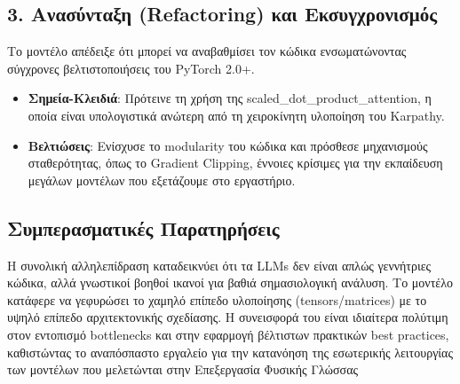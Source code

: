 \subsection*{3. Ανασύνταξη (Refactoring) και Εκσυγχρονισμός}
Το μοντέλο απέδειξε ότι μπορεί να αναβαθμίσει τον κώδικα ενσωματώνοντας σύγχρονες βελτιστοποιήσεις του PyTorch 2.0+.
\begin{itemize}
    \item \textbf{Σημεία-Κλειδιά}: Πρότεινε τη χρήση της scaled\_dot\_product\_attention, η οποία είναι υπολογιστικά ανώτερη από τη χειροκίνητη υλοποίηση του Karpathy.
    \item \textbf{Βελτιώσεις}: Ενίσχυσε το modularity του κώδικα και πρόσθεσε μηχανισμούς σταθερότητας, όπως το Gradient Clipping, έννοιες κρίσιμες για την εκπαίδευση μεγάλων μοντέλων που εξετάζουμε στο εργαστήριο.
\end{itemize}

    
\subsection*{Συμπερασματικές Παρατηρήσεις}
Η συνολική αλληλεπίδραση καταδεικνύει ότι τα LLMs δεν είναι απλώς γεννήτριες κώδικα, αλλά γνωστικοί βοηθοί ικανοί για βαθιά σημασιολογική ανάλυση. Το μοντέλο κατάφερε να γεφυρώσει το χαμηλό επίπεδο υλοποίησης (tensors/matrices) με το υψηλό επίπεδο αρχιτεκτονικής σχεδίασης. Η συνεισφορά του είναι ιδιαίτερα πολύτιμη στον εντοπισμό bottlenecks και στην εφαρμογή βέλτιστων πρακτικών best practices, καθιστώντας το αναπόσπαστο εργαλείο για την κατανόηση της εσωτερικής λειτουργίας των μοντέλων που μελετώνται στην Επεξεργασία Φυσικής Γλώσσας
